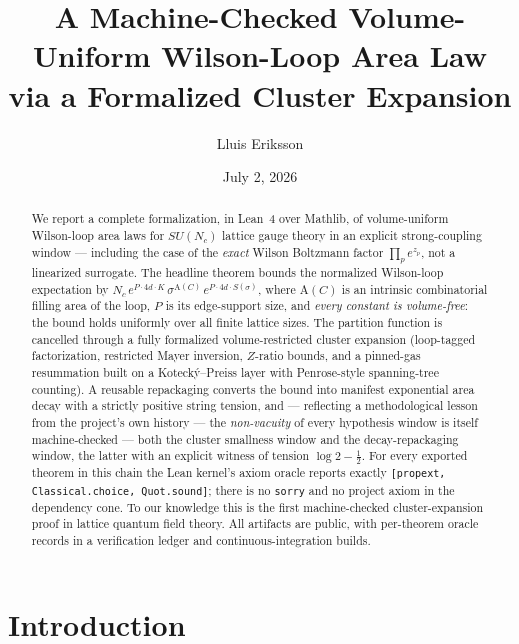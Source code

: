 \documentclass[11pt]{article}
\title{A Machine-Checked Volume-Uniform Wilson-Loop Area Law\\
via a Formalized Cluster Expansion}
\author{Lluis Eriksson}
\date{July 2, 2026}
\theoremstyle{remark}
\newcommand{\loopsupp}{P}
\newcommand{\Area}{\mathrm{A}}
\begin{document}
\maketitle

\begin{abstract}
We report a complete formalization, in Lean~4 over Mathlib, of
volume-uniform Wilson-loop area laws for $SU(N_c)$ lattice gauge theory in
an explicit strong-coupling window --- including the case of the
\emph{exact} Wilson Boltzmann factor $\prod_p e^{z_p}$, not a linearized
surrogate.  The headline theorem bounds the normalized Wilson-loop
expectation by
$N_c\, e^{\loopsupp \cdot 4d \cdot K}\,\sigma^{\Area(C)}\,
e^{\loopsupp \cdot 4d \cdot S(\sigma)}$,
where $\Area(C)$ is an intrinsic combinatorial filling area of the loop,
$\loopsupp$ is its edge-support size, and \emph{every constant is
volume-free}: the bound holds uniformly over all finite lattice sizes.  The
partition function is cancelled through a fully formalized volume-restricted
cluster expansion (loop-tagged factorization, restricted Mayer inversion,
$Z$-ratio bounds, and a pinned-gas resummation built on a
Koteck\'y--Preiss layer with Penrose-style spanning-tree counting).  A
reusable repackaging converts the bound into manifest exponential area decay
with a strictly positive string tension, and --- reflecting a methodological
lesson from the project's own history --- the \emph{non-vacuity} of every
hypothesis window is itself machine-checked --- both the cluster smallness
window and the decay-repackaging window, the latter with an explicit
witness of tension $\log 2 - \tfrac12$.  For every exported theorem in this
chain the Lean kernel's axiom oracle reports exactly
\texttt{[propext, Classical.choice, Quot.sound]}; there is no \texttt{sorry}
and no project axiom in the dependency cone.  To our knowledge this is the
first machine-checked cluster-expansion proof in lattice quantum field
theory.  All artifacts are public, with per-theorem oracle records in a
verification ledger and continuous-integration builds.
\end{abstract}

\section{Introduction}\label{sec:intro}
\end{document}
